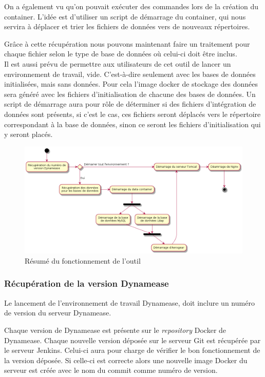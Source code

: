 On a également vu qu'on pouvait exécuter des commandes lors de la création du container. L'idée est d'utiliser un script de démarrage du container, qui nous servira à déplacer et trier les fichiers de données vers de nouveaux répertoires.

Grâce à cette récupération nous pouvons maintenant faire un traitement pour chaque fichier selon le type de base de données où celui-ci doit être inclus.\\

Il est aussi prévu de permettre aux utilisateurs de cet outil de lancer un environnement de travail, vide. C'est-à-dire seulement avec les bases de données initialisées, mais sans données. Pour cela l'image docker de stockage des données sera généré avec les fichiers d'initialisation de chacune des bases de données. Un script de démarrage aura pour rôle de déterminer si des fichiers d'intégration de données sont présents, si c'est le cas, ces fichiers seront déplacés vers le répertoire correspondant à la base de données, sinon ce seront les fichiers d'initialisation qui y seront placés. 

\begin{figure}[!h]
	\centering
	\includegraphics[scale=0.5]{img/activity_outil.png}
	\caption{\label{activity_outil} {Résumé du fonctionnement de l'outil}}
\end{figure}
\subsubsection{Récupération de la version Dynamease}

Le lancement de l'environnement de travail Dynamease, doit inclure un numéro de version du serveur Dynamease. 

Chaque version de Dynamease est présente sur le \textit{repository} Docker de Dynamease. Chaque nouvelle version déposée sur le serveur Git est récupérée par le serveur Jenkins. Celui-ci aura pour charge de vérifier le bon fonctionnement de la version déposée. Si celle-ci est correcte alors une nouvelle image Docker du serveur est créée avec le nom du commit comme numéro de version.

